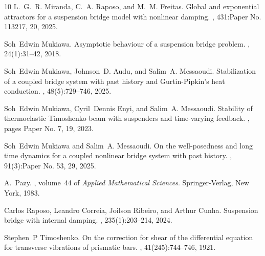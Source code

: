 \documentclass[11pt,reqno]{article}
\begin{document}
\begin{thebibliography}{10}
L.~G.~R. Miranda, C.~A. Raposo, and M.~M. Freitas.
\newblock Global and exponential attractors for a suspension bridge model with
  nonlinear damping.
, 431:Paper No. 113217, 20, 2025.

Soh~Edwin Mukiawa.
\newblock Asymptotic behaviour of a suspension bridge problem.
, 24(1):31--42, 2018.

Soh~Edwin Mukiawa, Johnson~D. Audu, and Salim~A. Messaoudi.
\newblock Stabilization of a coupled bridge system with past history and
  {G}urtin-{P}ipkin's heat conduction.
, 48(5):729--746, 2025.

Soh~Edwin Mukiawa, Cyril~Dennis Enyi, and Salim~A. Messaoudi.
\newblock Stability of thermoelastic {T}imoshenko beam with suspenders and
  time-varying feedback.
, pages Paper No. 7, 19, 2023.

Soh~Edwin Mukiawa and Salim~A. Messaoudi.
\newblock On the well-posedness and long time dynamics for a coupled nonlinear
  bridge system with past history.
, 91(3):Paper No. 53, 29, 2025.

A.~Pazy.
, volume~44 of {\em Applied Mathematical Sciences}.
\newblock Springer-Verlag, New York, 1983.

Carlos Raposo, Leandro Correia, Joilson Ribeiro, and Arthur Cunha.
\newblock Suspension bridge with internal damping.
, 235(1):203--214, 2024.

Stephen~P Timoshenko.
\newblock On the correction for shear of the differential equation for
  transverse vibrations of prismatic bars.
, 41(245):744--746, 1921.

\end{thebibliography}
\end{document}
